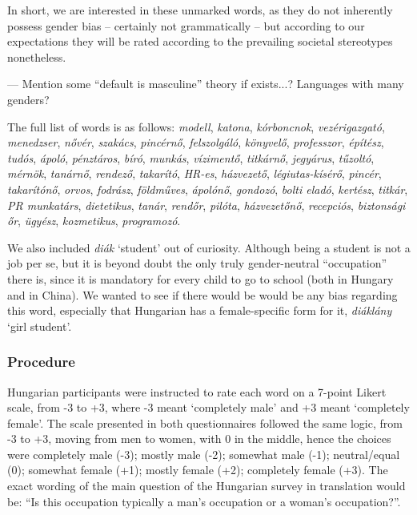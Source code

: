 \documentclass[11pt]{article}
\begin{document}
In short, we are interested in these unmarked words, as they do not inherently possess gender bias -- certainly not grammatically -- but according to our expectations they will be rated according to the prevailing societal stereotypes nonetheless.

--- Mention some ``default is masculine'' theory if exists...? Languages with many genders?

The full list of words is as follows: \textit{modell}, \textit{katona}, \textit{kórboncnok}, \textit{vezérigazgató}, \textit{menedzser}, \textit{nővér}, \textit{szakács}, \textit{pincérnő}, \textit{felszolgáló}, \textit{könyvelő}, \textit{professzor}, \textit{építész}, \textit{tudós}, \textit{ápoló}, \textit{pénztáros}, \textit{bíró}, \textit{munkás}, \textit{vízimentő}, \textit{titkárnő}, \textit{jegyárus}, \textit{tűzoltó}, \textit{mérnök}, \textit{tanárnő}, \textit{rendező}, \textit{takarító}, \textit{HR-es}, \textit{házvezető}, \textit{légiutas-kísérő}, \textit{pincér}, \textit{takarítónő}, \textit{orvos}, \textit{fodrász}, \textit{földműves}, \textit{ápolónő}, \textit{gondozó}, \textit{bolti eladó}, \textit{kertész}, \textit{titkár}, \textit{PR munkatárs}, \textit{dietetikus}, \textit{tanár}, \textit{rendőr}, \textit{pilóta}, \textit{házvezetőnő}, \textit{recepciós}, \textit{biztonsági őr}, \textit{ügyész}, \textit{kozmetikus}, \textit{programozó}.

We also included \textit{diák} `student' out of curiosity. Although being a student is not a job per se, but it is beyond doubt the only truly gender-neutral ``occupation'' there is, since it is mandatory for every child to go to school (both in Hungary and in China). We wanted to see if there would be would be any bias regarding this word, especially that Hungarian has a female-specific form for it, \textit{diáklány} `girl student'.

\subsubsection{Procedure}

Hungarian participants were instructed to rate each word on a 7-point Likert scale, from -3 to +3, where -3 meant `completely male' and +3 meant `completely female'. The scale presented in both questionnaires followed the same logic, from -3 to +3, moving from men to women, with 0 in the middle, hence the choices were completely male (-3); mostly male (-2); somewhat male (-1); neutral/equal (0); somewhat female (+1); mostly female (+2); completely female (+3). The exact wording of the main question of the Hungarian survey in translation would be: ``Is this occupation typically a man's occupation or a woman's occupation?''. 
\end{document}
